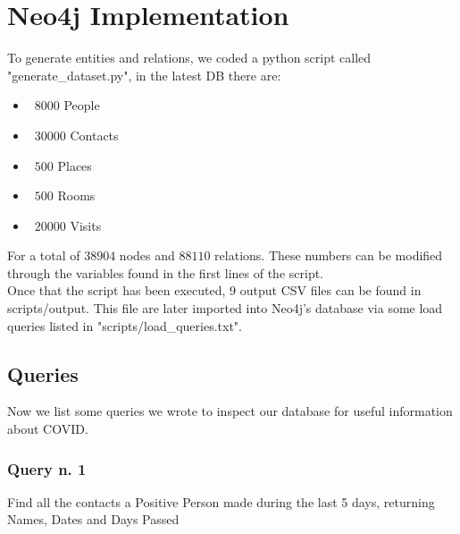\documentclass[table, 12pt]{article}
\begin{document}
\section{Neo4j Implementation}
To generate entities and relations, we coded a python script called "generate\_dataset.py", in the latest DB there are:
\begin{itemize}
    \setlength\itemsep{-0.5em}
    \item ~$8000$ People  \\
    \item ~$30000$ Contacts \\
    \item ~$500$ Places \\
    \item ~$500$ Rooms \\
    \item ~$20000$ Visits  
\end{itemize}
For a total of $38904$ nodes and $88110$ relations.
These numbers can be modified through the variables found in the first lines of the script. \\
Once that the script has been executed, 9 output CSV files can be found in scripts/output. This file are later imported into Neo4j's database via some load queries listed in "scripts/load\_queries.txt".
\subsection{Queries}

Now we list some queries we wrote to inspect our database for useful information about COVID.

\subsubsection*{Query n. 1}
Find all the contacts a Positive Person made during the last 5 days, returning Names, Dates and Days Passed
\end{document}
